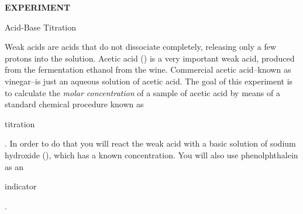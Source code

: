 \documentclass[main.tex]{subfiles}
\begin{document}
\pagestyle{empty}


\hfill
\vspace{0.2cm}
\begin{center}
{\large \bfseries 
EXPERIMENT 
\par
\Huge
Acid-Base Titration
\\[5pt] \par}
\vspace{0.2cm}
\end{center}
\par

\vspace{0.2cm}{\large \bfseries Goal}
Weak acids are acids that do not dissociate completely, releasing only a few protons into the solution. Acetic acid ()  is a very important weak acid, produced from the fermentation ethanol from the wine. Commercial acetic acid--known as vinegar--is just an aqueous solution of acetic acid. The goal of this experiment is to calculate the \textit{molar concentration} of a sample of acetic acid by means of a standard chemical procedure known as \begin{it}titration\end{it}. In order to do that you will react the weak acid with a basic solution of sodium hydroxide (), which has a known concentration. You will also use phenolphthalein as an \begin{it}indicator\end{it}. 
\end{document}
